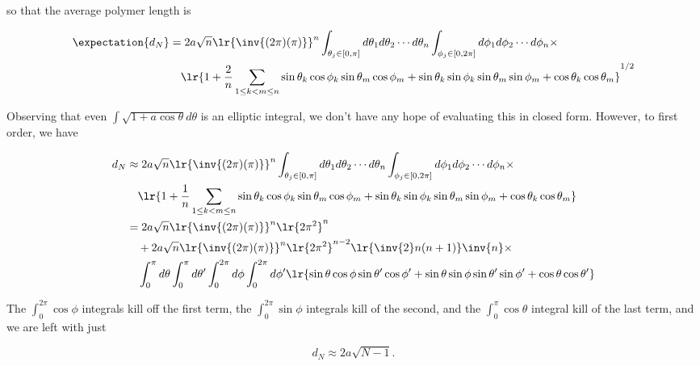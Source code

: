 {so that the average polymer length is

\begin{equation}\label{eqn:basicStatMechProblemSet3Problem2:80}
\begin{aligned}
\expectation{
d_N 
} 
&=
2 a \sqrt{n} 
\lr{\inv{(2 \pi)(\pi)}}^{n} 
\int_{\theta_j \in [0, \pi]}
d\theta_1 d\theta_2 \cdots d\theta_n 
\int_{\phi_j \in [0, 2 \pi]}
d\phi_1 d\phi_2 \cdots d\phi_n \times \\
&\quad \lr{ 1 + \frac{2}{n} \sum_{1 \le k < m \le n} 
\sin\theta_k \cos\phi_k \sin\theta_m \cos\phi_m 
+
\sin\theta_k \sin\phi_k \sin\theta_m \sin\phi_m 
+
\cos\theta_k \cos\theta_m
}^{1/2}
\end{aligned}
\end{equation}

Observing that even $\int \sqrt{1 + a \cos\theta} d\theta$ is an elliptic integral, we don't have any hope of evaluating this in closed form.  However, to first order, we have

\begin{equation}\label{eqn:basicStatMechProblemSet3Problem2:100}
\begin{aligned}
d_N
&\approx
2 a \sqrt{n} 
\lr{\inv{(2 \pi)(\pi)}}^{n} 
\int_{\theta_j \in [0, \pi]}
d\theta_1 d\theta_2 \cdots d\theta_n 
\int_{\phi_j \in [0, 2 \pi]}
d\phi_1 d\phi_2 \cdots d\phi_n \times \\
&\quad \lr{ 1 + \frac{1}{n} \sum_{1 \le k < m \le n} 
\sin\theta_k \cos\phi_k \sin\theta_m \cos\phi_m 
+
\sin\theta_k \sin\phi_k \sin\theta_m \sin\phi_m 
+
\cos\theta_k \cos\theta_m
}
 \\
&=
2 a \sqrt{n} 
\lr{\inv{(2 \pi)(\pi)}}^{n} 
\lr{2 \pi^2}^n \\
&\quad +
2 a \sqrt{n} 
\lr{\inv{(2 \pi)(\pi)}}^{n} 
\lr{2 \pi^2}^{n - 2} \lr{\inv{2} n(n+1)} \inv{n} \times \\
&\quad \int_0^{\pi}
d\theta 
\int_0^{\pi}
d\theta'
\int_0^{2 \pi}
d\phi
\int_0^{2 \pi}
d\phi'
\lr{
\sin\theta \cos\phi \sin\theta' \cos\phi' 
+
\sin\theta \sin\phi \sin\theta' \sin\phi' 
+
\cos\theta \cos\theta'
}
\end{aligned}
\end{equation}

The $\int_0^{2 \pi} \cos\phi$ integrals kill off the first term, the $\int_0^{2 \pi} \sin\phi$ integrals kill of the second, and the $\int_0^\pi \cos\theta$ integral kill of the last term, and we are left with just

\begin{equation}\label{eqn:basicStatMechProblemSet3Problem2:120}
d_N \approx 2 a \sqrt{N-1}.
\end{equation}

}

